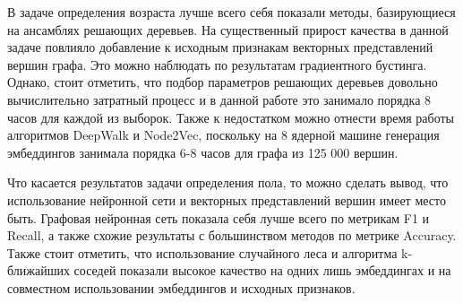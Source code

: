 В задаче определения возраста лучше всего себя показали методы, базирующиеся на ансамблях решающих деревьев. На существенный прирост качества в данной задаче повлияло добавление к исходным признакам векторных представлений вершин графа. Это можно наблюдать по результатам градиентного бустинга. Однако, стоит отметить, что подбор параметров решающих деревьев довольно вычислительно затратный процесс и в данной работе это занимало порядка 8 часов для каждой из выборок. Также к недостатком можно отнести время работы алгоритмов DeepWalk и Node2Vec, поскольку на 8 ядерной машине генерация эмбеддингов занимала порядка 6-8 часов для графа из 125 000 вершин. 

Что касается результатов задачи определения пола, то можно сделать вывод, что использование нейронной сети и векторных представлений вершин имеет место быть. Графовая нейронная сеть показала себя лучше всего по метрикам F1 и Recall, а также схожие результаты с большинством методов по метрике Accuracy. Также стоит отметить, что использование случайного леса и алгоритма k-ближайших соседей показали высокое качество на одних лишь эмбеддингах и на совместном использовании эмбеддингов и исходных признаков.

\clearpage